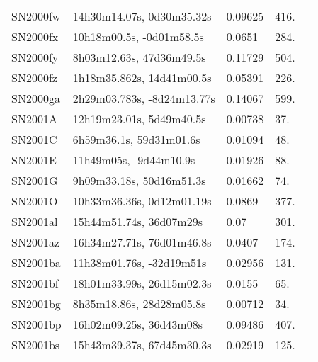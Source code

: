 \begin{longtable}{lllll}
         SN2000fw &      14h30m14.07s, 0d30m35.32s &  0.09625 &           416. &    \citet{2003SDSS1.C...0000:} \\
         SN2000fx &       10h18m00.5s, -0d01m58.5s &   0.0651 &           284. &    \citet{2011ApJ...735..125S} \\
         SN2000fy &       8h03m12.63s, 47d36m49.5s &  0.11729 &           504. &    \citet{2004SDSS2.C...0000:} \\
         SN2000fz &      1h18m35.862s, 14d41m00.5s &  0.05391 &           226. &    \citet{2003SDSS1.C...0000:} \\
         SN2000ga &     2h29m03.783s, -8d24m13.77s &  0.14067 &           599. &    \citet{2004SDSS2.C...0000:} \\
          SN2001A &       12h19m23.01s, 5d49m40.5s &  0.00738 &            37. &    \citet{2011MNRAS.413..813C} \\
          SN2001C &        6h59m36.1s, 59d31m01.6s &  0.01094 &            48. &    \citet{1999PASP..111..438F} \\
          SN2001E &         11h49m05s, -9d44m10.9s &  0.01926 &            88. &    \citet{1991RC3.9.C...0000d} \\
          SN2001G &       9h09m33.18s, 50d16m51.3s &  0.01662 &            74. &    \citet{2004SDSS2.C...0000:} \\
          SN2001O &      10h33m36.36s, 0d12m01.19s &   0.0869 &           377. &    \citet{2004MNRAS.349.1397C} \\
         SN2001al &        15h44m51.74s, 36d07m29s &     0.07 &           301. &    \citet{2001IAUC.7607B...1G} \\
         SN2001az &      16h34m27.71s, 76d01m46.8s &   0.0407 &           174. &    \citet{2001IAUC.7615B...1M} \\
         SN2001ba &       11h38m01.76s, -32d19m51s &  0.02956 &           131. &  \citet{2003AandA...412...57P} \\
         SN2001bf &      18h01m33.99s, 26d15m02.3s &   0.0155 &            65. &    \citet{1996AJ....112.1803M} \\
         SN2001bg &       8h35m18.86s, 28d28m05.8s &  0.00712 &            34. &    \citet{1991RC3.9.C...0000d} \\
         SN2001bp &        16h02m09.25s, 36d43m08s &  0.09486 &           407. &    \citet{2005SDSS4.C...0000:} \\
         SN2001bs &      15h43m39.37s, 67d45m30.3s &  0.02919 &           125. &    \citet{1999PASP..111..438F} \\

\end{longtable}
